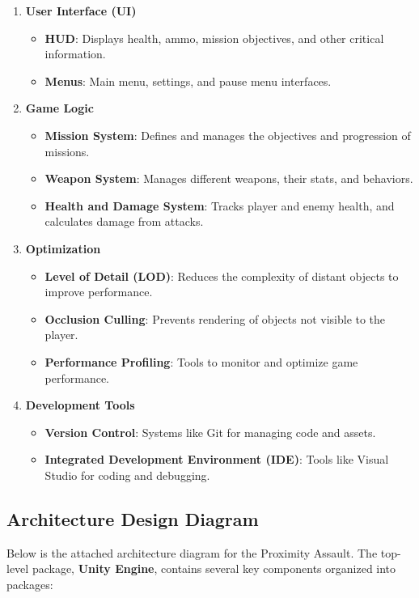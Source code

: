 \begin{enumerate}
	\item \textbf{User Interface (UI)}
	\begin{itemize}
		\item \textbf{HUD}: Displays health, ammo, mission objectives, and other critical information.
		\item \textbf{Menus}: Main menu, settings, and pause menu interfaces.
	\end{itemize}
	
	\item \textbf{Game Logic}
	\begin{itemize}
		\item \textbf{Mission System}: Defines and manages the objectives and progression of missions.
		\item \textbf{Weapon System}: Manages different weapons, their stats, and behaviors.
		\item \textbf{Health and Damage System}: Tracks player and enemy health, and calculates damage from attacks.
	\end{itemize}
	
	\item \textbf{Optimization}
	\begin{itemize}
		\item \textbf{Level of Detail (LOD)}: Reduces the complexity of distant objects to improve performance.
		\item \textbf{Occlusion Culling}: Prevents rendering of objects not visible to the player.
		\item \textbf{Performance Profiling}: Tools to monitor and optimize game performance.
	\end{itemize}
	
	\item \textbf{Development Tools}
	\begin{itemize}
		\item \textbf{Version Control}: Systems like Git for managing code and assets.
		\item \textbf{Integrated Development Environment (IDE)}: Tools like Visual Studio for coding and debugging.
	\end{itemize}
\end{enumerate}

\subsection{Architecture Design Diagram}
Below is the attached architecture diagram for the Proximity Assault.
The top-level package, \textbf{Unity Engine}, contains several key components organized into packages:

